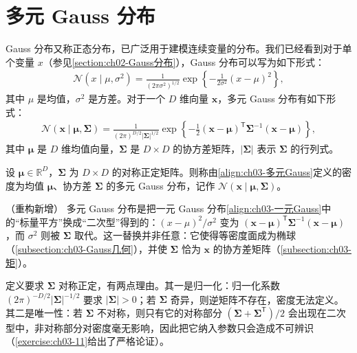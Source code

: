 \documentclass[../../main.tex]{subfiles}
\begin{document}
\section{多元 Gauss 分布}\label{section:ch03-多元Gauss分布}

Gauss 分布又称正态分布，已广泛用于建模连续变量的分布。我们已经看到对于单个变量 $x$（参见\cref{section:ch02-Gauss分布}），Gauss 分布可以写为如下形式：
\begin{align}
\mathcal{N}(x\mid\mu,\sigma^{2})=\frac{1}{(2\pi\sigma^{2})^{1/2}}\exp\left\{-\frac{1}{2\sigma^{2}}(x-\mu)^{2}\right\},
\label{align:ch03-一元Gauss}
\end{align}
其中 $\mu$ 是均值，$\sigma^{2}$ 是方差。对于一个 $D$ 维向量 $\boldsymbol{x}$，多元 Gauss 分布有如下形式：
\begin{align}
\mathcal{N}(\boldsymbol{x}\mid\boldsymbol{\mu},\boldsymbol{\Sigma})=\frac{1}{(2\pi)^{D/2}\lvert\boldsymbol{\Sigma}\rvert^{1/2}}\exp\left\{-\frac{1}{2}(\boldsymbol{x}-\boldsymbol{\mu})^{\mathsf{T}}\boldsymbol{\Sigma}^{-1}(\boldsymbol{x}-\boldsymbol{\mu})\right\},
\label{align:ch03-多元Gauss}
\end{align}
其中 $\boldsymbol{\mu}$ 是 $D$ 维均值向量，$\boldsymbol{\Sigma}$ 是 $D\times D$ 的协方差矩阵，$\lvert\boldsymbol{\Sigma}\rvert$ 表示 $\boldsymbol{\Sigma}$ 的行列式。

\begin{definition}[多元 Gauss 分布]\label{definition:ch03-多元Gauss分布}
设 $\boldsymbol{\mu}\in\mathbb{R}^{D}$，$\boldsymbol{\Sigma}$ 为 $D\times D$ 的对称正定矩阵。则称由\eqref{align:ch03-多元Gauss}定义的密度为均值 $\boldsymbol{\mu}$、协方差 $\boldsymbol{\Sigma}$ 的多元 Gauss 分布，记作 $\mathcal{N}(\boldsymbol{x}\mid\boldsymbol{\mu},\boldsymbol{\Sigma})$。
\end{definition}

\begin{remark}（重构新增）
多元 Gauss 分布是把一元 Gauss 分布\eqref{align:ch03-一元Gauss}中的“标量平方”换成“二次型”得到的：$(x-\mu)^{2}/\sigma^{2}$ 变为 $(\boldsymbol{x}-\boldsymbol{\mu})^{\mathsf{T}}\boldsymbol{\Sigma}^{-1}(\boldsymbol{x}-\boldsymbol{\mu})$，而 $\sigma^{2}$ 则被 $\boldsymbol{\Sigma}$ 取代。这一替换并非任意：它使得等密度面成为椭球（\cref{subsection:ch03-Gauss几何}），并使 $\boldsymbol{\Sigma}$ 恰为 $\boldsymbol{x}$ 的协方差矩阵（\cref{subsection:ch03-矩}）。

定义要求 $\boldsymbol{\Sigma}$ 对称正定，有两点理由。其一是归一化：归一化系数 $(2\pi)^{-D/2}\lvert\boldsymbol{\Sigma}\rvert^{-1/2}$ 要求 $\lvert\boldsymbol{\Sigma}\rvert>0$；若 $\boldsymbol{\Sigma}$ 奇异，则逆矩阵不存在，密度无法定义。其二是唯一性：若 $\boldsymbol{\Sigma}$ 不对称，则只有它的对称部分 $(\boldsymbol{\Sigma}+\boldsymbol{\Sigma}^{\mathsf{T}})/2$ 会出现在二次型中，非对称部分对密度毫无影响，因此把它纳入参数只会造成不可辨识（\cref{exercise:ch03-11}给出了严格论证）。
\end{remark}
\end{document}

